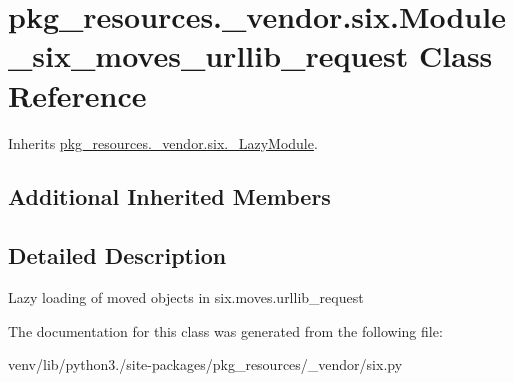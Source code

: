 \hypertarget{classpkg__resources_1_1__vendor_1_1six_1_1_module__six__moves__urllib__request}{}\section{pkg\+\_\+resources.\+\_\+vendor.\+six.\+Module\+\_\+six\+\_\+moves\+\_\+urllib\+\_\+request Class Reference}
\label{classpkg__resources_1_1__vendor_1_1six_1_1_module__six__moves__urllib__request}


Inherits \hyperlink{classpkg__resources_1_1__vendor_1_1six_1_1___lazy_module}{pkg\+\_\+resources.\+\_\+vendor.\+six.\+\_\+\+Lazy\+Module}.

\subsection*{Additional Inherited Members}


\subsection{Detailed Description}
\begin{DoxyVerb}Lazy loading of moved objects in six.moves.urllib_request\end{DoxyVerb}
 

The documentation for this class was generated from the following file\+:\begin{DoxyCompactItemize}
\item 
venv/lib/python3./site-\/packages/pkg\+\_\+resources/\+\_\+vendor/six.\+py\end{DoxyCompactItemize}
